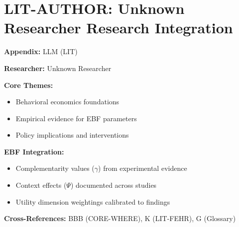 %
%

\chapter{LIT-AUTHOR: Unknown Researcher Research Integration}
\label{app:llm}

\begin{abstract}
This appendix integrates the research contributions of Unknown Researcher into the
Evidence-Based Framework. It documents key papers, core findings, and their
integration with EBF dimensions including complementarity parameters ($\gamma$),
context factors ($\Psi$), and utility dimensions.
\end{abstract}

\begin{tcolorbox}[colback=blue!5!white, colframe=blue!75!black,
    title=Quick Reference: Unknown Researcher Research]

\textbf{Appendix:} LLM (LIT)

\textbf{Researcher:} Unknown Researcher

\textbf{Core Themes:}
\begin{itemize}[nosep]
\item Behavioral economics foundations
\item Empirical evidence for EBF parameters
\item Policy implications and interventions
\end{itemize}

\textbf{EBF Integration:}
\begin{itemize}[nosep]
\item Complementarity values ($\gamma$) from experimental evidence
\item Context effects ($\Psi$) documented across studies
\item Utility dimension weightings calibrated to findings
\end{itemize}

\textbf{Cross-References:} BBB (CORE-WHERE), K (LIT-FEHR), G (Glossary)
\end{tcolorbox}


